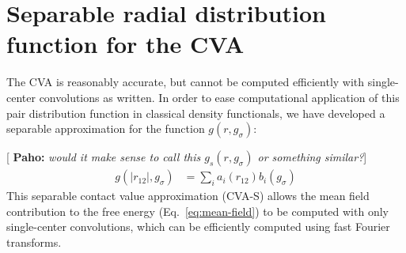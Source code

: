 \documentclass[letterpaper,twocolumn,amsmath,amssymb,pre,aps,10pt]{revtex4-1}
\newcommand{\green}[1]{{\bf \color{green} #1}}
\newcommand{\pahosays}[1]{{\color{red} [\green{Paho:} \emph{#1}]}}
\begin{document}
\newcommand\kappaO{\kappa_0}
\newcommand\kappaI{\kappa_1}
\newcommand\kappaZ{\kappa_2}



\section{Separable radial distribution function for the CVA}

The CVA is reasonably accurate, but cannot be computed efficiently
with single-center convolutions as written.  In order to ease
computational application of this pair distribution function in
classical density functionals, we have developed a separable
approximation for the function $g(r,g_\sigma)$:

\pahosays{would it make sense to call this $g_s(r,g_\sigma)$ or
  something similar?}
\begin{align}
  g(|r_{12}|, g_\sigma) &= \sum_{i} a_i(r_{12}) b_i(g_\sigma)
\end{align}
This separable contact value approximation (CVA-S) allows the mean
field contribution to the free energy (Eq.~\ref{eq:mean-field}) to be
computed with only single-center convolutions, which can be
efficiently computed using fast Fourier transforms.


\end{document}
